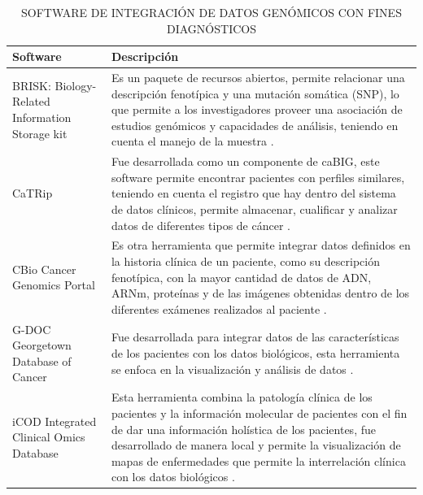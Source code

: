 {\begin{table}[]
	\centering
	\caption{SOFTWARE DE INTEGRACIÓN DE DATOS GENÓMICOS CON FINES DIAGNÓSTICOS}
	\label{r}
	\begin{tabular}{|p{5cm}|p{10cm}|}
		\hline
		Software     & Descripción                                                                                                                                                                                                                                                                                                                                                                                 \\ \hline
		BRISK: Biology-Related Information Storage kit      & Es un paquete de recursos abiertos, permite relacionar una descripción fenotípica y una mutación somática (SNP), lo que permite a los investigadores proveer una asociación de estudios genómicos y capacidades de análisis, teniendo en cuenta el manejo de la muestra \cite{Triplet2014}.     \\ \cline{1-2}
		CaTRip       & Fue desarrollada como un componente de caBIG, este software permite encontrar pacientes con perfiles similares, teniendo en cuenta el registro que hay dentro del sistema de datos clínicos, permite almacenar, cualificar y analizar datos de diferentes tipos de cáncer \cite{Canuel2015}.       \\ \cline{1-2}
		CBio Cancer Genomics Portal & Es otra herramienta que permite integrar datos definidos en la historia clínica de un paciente, como su descripción fenotípica, con la mayor cantidad de datos de ADN, ARNm, proteínas y de las imágenes obtenidas dentro de los diferentes exámenes realizados al paciente  \cite{Canuel2015}.                                                                                                                                                                                                              \\ \hline
		G-DOC Georgetown Database of Cancer & Fue desarrollada para integrar datos de las características de los pacientes con los datos biológicos, esta herramienta se enfoca en la visualización y análisis de datos \cite{Canuel2015}.                                                                                                  \\ \cline{1-2}
		iCOD Integrated Clinical Omics Database     & Esta herramienta combina la patología clínica de los pacientes y la información molecular de pacientes con el fin de dar una información holística de los pacientes, fue desarrollado de manera local y permite la visualización de mapas de enfermedades que permite la interrelación clínica con los datos biológicos \cite{Canuel2015}.      \\ \hline
		

\end{tabular}
\end{table}}
